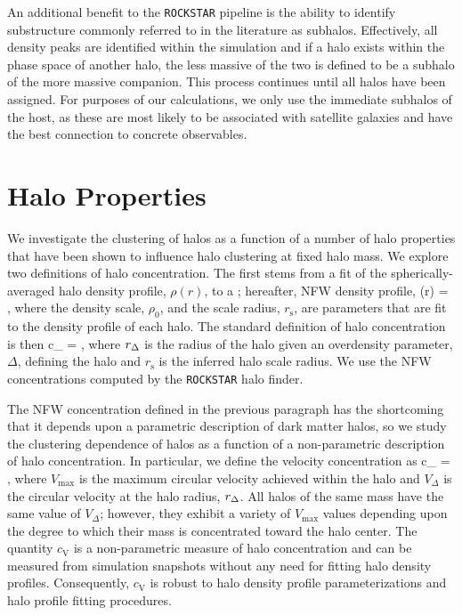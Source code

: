 \documentclass[usenatbib]{mnras}
\begin{document}
An additional benefit to the {\tt ROCKSTAR} pipeline is the ability to identify substructure commonly referred to in the
literature as subhalos. Effectively, all density peaks are identified within the simulation and if a halo exists within the phase
space of another halo, the less massive of the two is defined to be a subhalo of the more massive companion. This process
continues until all halos have been assigned. For purposes of our calculations, we only use the immediate subhalos of the host,
as these are most likely to be associated with satellite galaxies and have the best connection to concrete observables.

\section{Halo Properties}
\label{section:haloprops}

We investigate the clustering of halos as a function of a number of halo properties 
that have been shown to influence halo clustering at fixed halo mass. We explore 
two definitions of halo concentration. The first stems from a fit of the spherically-averaged 
halo density profile, $\rho(r)$, to a \citet{navarro_etal97}; hereafter, NFW density profile, 
%
\beq
\rho(r) = ,
\eeq
%
where the density scale, $\rho_0$, and the scale radius, $r_{\mathrm{s}}$, are parameters 
that are fit to the density profile of each halo. The standard definition of halo concentration is then 
\beq
c_{} = ,
\eeq
where $r_{\Delta}$ is the radius of the halo given an overdensity parameter, $\Delta$, defining the halo 
and $r_{\mathrm{s}}$ is the inferred halo scale radius. We use the NFW concentrations computed by the 
{\tt ROCKSTAR} halo finder.  

The NFW concentration defined in the previous paragraph has the shortcoming that it 
depends upon a parametric description of dark matter halos, so we study the clustering dependence 
of halos as a function of a non-parametric description of halo concentration. In particular, we 
define the velocity concentration as 
\beq
c_{} = , 
\eeq
where $V_{\mathrm{max}}$ is the maximum circular velocity achieved within the halo and $V_{\Delta}$ is 
the circular velocity at the halo radius, $r_{\Delta}$. All halos of the same mass have the same value of $V_{\Delta}$; however, 
they exhibit a variety of $V_{\mathrm{max}}$ values depending upon the degree to which their mass is concentrated toward 
the halo center. The quantity $c_{\mathrm{V}}$ is a non-parametric measure of halo concentration and can be measured from 
simulation snapshots without any need for fitting halo density profiles. Consequently, $c_{\mathrm{V}}$ is robust to halo density 
profile parameterizations and halo profile fitting procedures. 
\end{document}
